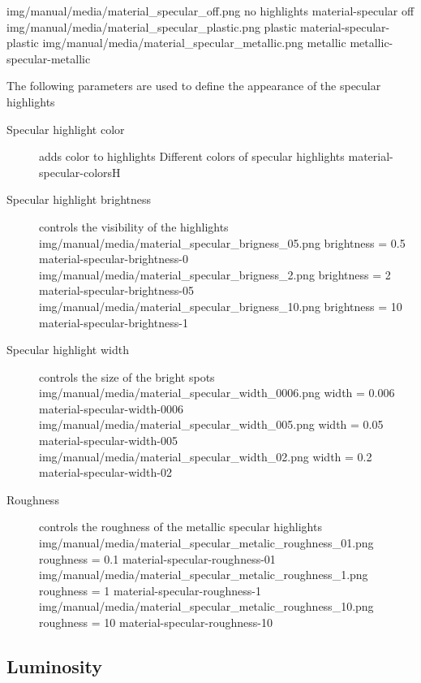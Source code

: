 \threeImagesWithTwoCaptionsFullWidth
{img/manual/media/material_specular_off.png}
{no highlights}
{material-specular off}
{img/manual/media/material_specular_plastic.png}
{plastic}
{material-specular-plastic}
{img/manual/media/material_specular_metallic.png}
{metallic}
{metallic-specular-metallic}

The following parameters are used to define the appearance of the specular highlights
\begin{description}
	\item[Specular highlight color] adds color to highlights
	{Different colors of specular highlights}
	{material-specular-colors}{H}

	\item[Specular highlight brightness] controls the visibility of the highlights
	\threeImagesWithTwoCaptionsFullWidth
	{img/manual/media/material_specular_brigness_05.png}
	{brightness = 0.5}
	{material-specular-brightness-0}
	{img/manual/media/material_specular_brigness_2.png}
	{brightness = 2}
	{material-specular-brightness-05}
	{img/manual/media/material_specular_brigness_10.png}
	{brightness = 10}
	{material-specular-brightness-1}
	
	\item[Specular highlight width] controls the size of the bright spots
	\threeImagesWithTwoCaptionsFullWidth
	{img/manual/media/material_specular_width_0006.png}
	{width = 0.006}
	{material-specular-width-0006}
	{img/manual/media/material_specular_width_005.png}
	{width = 0.05}
	{material-specular-width-005}
	{img/manual/media/material_specular_width_02.png}
	{width = 0.2}
	{material-specular-width-02}
	
	\item[Roughness] controls the roughness of the metallic specular highlights
	\threeImagesWithTwoCaptionsFullWidth
	{img/manual/media/material_specular_metalic_roughness_01.png}
	{roughness = 0.1}
	{material-specular-roughness-01}
	{img/manual/media/material_specular_metalic_roughness_1.png}
	{roughness = 1}
	{material-specular-roughness-1}
	{img/manual/media/material_specular_metalic_roughness_10.png}
	{roughness = 10}
	{material-specular-roughness-10}
		
\end{description}

\subsection{Luminosity}\label{materials-luminosity}

